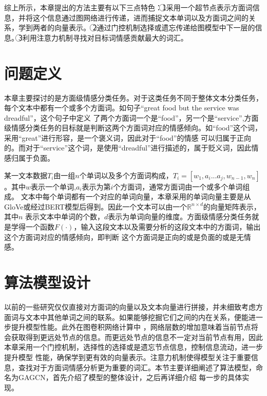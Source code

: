 综上所示，本章提出的方法主要有以下三点特色：\noindent\textcircled{1}采用一个超节点表示方面词信息，并将这个信息通过图网络进行传递，进而捕捉文本单词以及方面词之间的关系，学到两者的向量表示。
\noindent\textcircled{2}通过门控机制选择或遗忘传递给图模型中下一层的信息。\noindent\textcircled{3}利用注意力机制寻找对目标词情感贡献最大的词汇。

\section{问题定义}
本章主要探讨的是方面级情感分类任务。对于这类任务不同于整体文本分类任务，每个文本中都有一个或多个方面词。如句子“great food but the service was dreadful”，这个句子中定义
了两个方面词一个是“food”，另一个是“service”,方面级情感分类任务的目标就是判断这两个方面词对应的情感倾向。如“food”这个词，采用“great”进行形容，是一个褒义词，因此对于“food”的情感
可以归属于正向的。而对于“service”这个词，是使用“dreadful”进行描述的，属于贬义词，因此情感归属于负面。

某一文本数据$T_i$由一组$n$个单词以及多个方面词构成，$T_i=[w_1,a_{i}...a_{j},w_{n-1},w_n]$。其中$w$表示一个单词,$a_i$表示为第$i$个方面词，通常方面词由一个或多个单词组成。
文本中每个单词都有一个对应的单词向量，本章采用的单词向量主要是从GloVe或经过BERT模型后得到。因此一个文本可以由一个$\mathbb{R}^{n\times d}$的向量矩阵表示，其中$n$
表示文本中单词的个数，$d$表示为单词向量的维度。方面级情感分类任务就是学得一个函数$F(\cdot)$，输入这段文本以及需要分析的这段文本中的方面词，输出这个方面词对应的情感倾向，即判断
这个方面词是正向的或是负面的或是无情感。

\section{算法模型设计}
以前的一些研究仅仅直接对方面词的向量以及文本向量进行拼接，并未细致考虑方面词与文本中其他单词之间的联系。如果能够挖掘它们之间的内在关系，便能进一步提升模型性能。此外在图卷积网络计算中
，网络层数的增加意味着当前节点将会获取得到更远处节点的信息。而更远处节点的信息不一定对当前节点有用，因此本章采用一个门控机制，选择性的选择或是遗忘节点信息，控制信息流动，进一步提升模型
性能，确保学到更有效的向量表示。注意力机制使得模型关注于重要信息，查找对于方面词情感分析更为重要的词汇。本节主要详细阐述了算法模型，命名为GAGCN，首先介绍了模型的整体设计，之后再详细介绍
每一步的具体实现。

